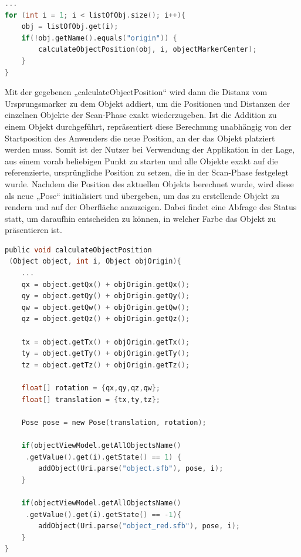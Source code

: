 \begin{lstlisting}[language=C,
    frame=lines,           % Ein Rahmen um den Code (single for box, lines for top and bottom)
    xleftmargin=\parindent,  % Rahmen link von den Zahlen
    style=algoBericht,
    label={code:listOfObjects},
    captionpos=b,           % Caption unter den Code setzen
caption={Abfolge der Objekte in der Liste}]
... 
for (int i = 1; i < listOfObj.size(); i++){
    obj = listOfObj.get(i);
    if(!obj.getName().equals("origin")) {
        calculateObjectPosition(obj, i, objectMarkerCenter);
    }
}
\end{lstlisting}
Mit der gegebenen „calculateObjectPosition“ wird dann die Distanz vom Ursprungsmarker zu dem Objekt addiert, um 
die Positionen und Distanzen der einzelnen Objekte der Scan-Phase exakt wiederzugeben. Ist die Addition zu einem Objekt durchgeführt, repräsentiert diese 
Berechnung unabhängig von der Startposition des Anwenders die neue Position, an der das Objekt platziert werden muss. Somit ist der Nutzer bei Verwendung der 
Applikation in der Lage, aus einem vorab beliebigen Punkt zu starten und alle Objekte exakt auf die referenzierte, ursprüngliche Position zu setzen, die 
in der Scan-Phase festgelegt wurde. Nachdem die Position des aktuellen Objekts berechnet wurde, wird diese als neue „Pose“ initialisiert und übergeben, um 
das zu erstellende Objekt zu rendern und auf der Oberfläche anzuzeigen. Dabei findet eine Abfrage des Status statt, um daraufhin 
entscheiden zu können, in welcher Farbe das Objekt zu präsentieren ist.  
\\ 
\begin{lstlisting}[language=C,
    frame=lines,           % Ein Rahmen um den Code (single for box, lines for top and bottom)
    xleftmargin=\parindent,  % Rahmen link von den Zahlen
    style=algoBericht,
    label={code:additionOfObject},
    captionpos=b,           % Caption unter den Code setzen
caption={Berechnung der Markerplatzierung}]
public void calculateObjectPosition
 (Object object, int i, Object objOrigin){
    ... 
    qx = object.getQx() + objOrigin.getQx();
    qy = object.getQy() + objOrigin.getQy();
    qw = object.getQw() + objOrigin.getQw();
    qz = object.getQz() + objOrigin.getQz();

    tx = object.getTx() + objOrigin.getTx();
    ty = object.getTy() + objOrigin.getTy();
    tz = object.getTz() + objOrigin.getTz();

    float[] rotation = {qx,qy,qz,qw};
    float[] translation = {tx,ty,tz};

    Pose pose = new Pose(translation, rotation);

    if(objectViewModel.getAllObjectsName()
     .getValue().get(i).getState() == 1) {
        addObject(Uri.parse("object.sfb"), pose, i);
    }

    if(objectViewModel.getAllObjectsName()
     .getValue().get(i).getState() == -1){
        addObject(Uri.parse("object_red.sfb"), pose, i);
    }
}
\end{lstlisting}
